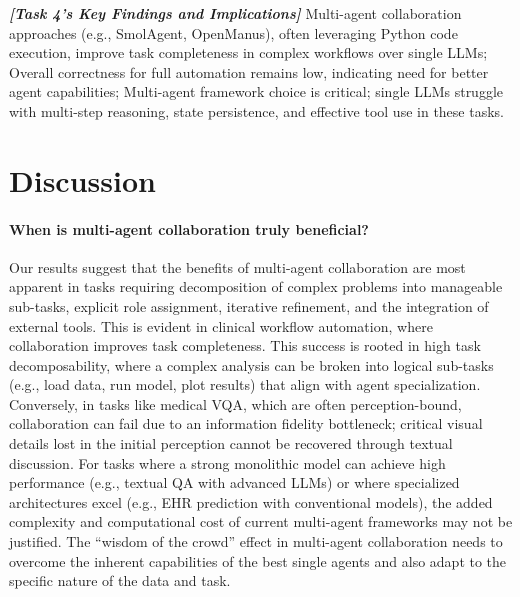 \documentclass{article}
\begin{document}
\newpage

\begin{custommdframed}
\textbf{\textit{[Task 4's Key Findings and Implications]}}
 Multi-agent collaboration approaches (e.g., SmolAgent, OpenManus), often leveraging Python code execution, improve task completeness in complex workflows over single LLMs;  Overall correctness for full automation remains low, indicating need for better agent capabilities;  Multi-agent framework choice is critical; single LLMs struggle with multi-step reasoning, state persistence, and effective tool use in these tasks.
\end{custommdframed}

\section{Discussion}
\label{sec:discussion}

\paragraph{When is multi-agent collaboration truly beneficial?}
Our results suggest that the benefits of multi-agent collaboration are most apparent in tasks requiring decomposition of complex problems into manageable sub-tasks, explicit role assignment, iterative refinement, and the integration of external tools. This is evident in clinical workflow automation, where collaboration improves task completeness. This success is rooted in high task decomposability, where a complex analysis can be broken into logical sub-tasks (e.g., load data, run model, plot results) that align with agent specialization. Conversely, in tasks like medical VQA, which are often perception-bound, collaboration can fail due to an information fidelity bottleneck; critical visual details lost in the initial perception cannot be recovered through textual discussion. For tasks where a strong monolithic model can achieve high performance (e.g., textual QA with advanced LLMs) or where specialized architectures excel (e.g., EHR prediction with conventional models), the added complexity and computational cost of current multi-agent frameworks may not be justified. The ``wisdom of the crowd'' effect in multi-agent collaboration needs to overcome the inherent capabilities of the best single agents and also adapt to the specific nature of the data and task.
\end{document}
